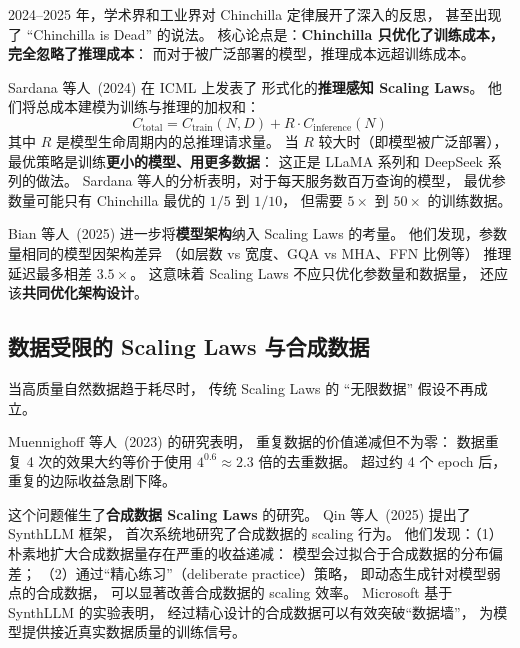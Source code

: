 2024--2025 年，学术界和工业界对 Chinchilla 定律展开了深入的反思，
甚至出现了 “Chinchilla is Dead” 的说法。
核心论点是：\textbf{Chinchilla 只优化了训练成本，
完全忽略了推理成本}：
而对于被广泛部署的模型，推理成本远超训练成本。

Sardana 等人~(2024) 在 ICML 上发表了%
形式化的\textbf{推理感知 Scaling Laws}。
他们将总成本建模为训练与推理的加权和：
\begin{equation}
  C_{\mathrm{total}} = C_{\mathrm{train}}(N, D)
  + R \cdot C_{\mathrm{inference}}(N)
  \label{eq:inference-aware}
\end{equation}
其中 $R$ 是模型生命周期内的总推理请求量。
当 $R$ 较大时（即模型被广泛部署），
最优策略是训练\textbf{更小的模型、用更多数据}：
这正是 LLaMA 系列和 DeepSeek 系列的做法。
Sardana 等人的分析表明，对于每天服务数百万查询的模型，
最优参数量可能只有 Chinchilla 最优的 $1/5$ 到 $1/10$，
但需要 $5\times$ 到 $50\times$ 的训练数据。

Bian 等人~(2025) 进一步将\textbf{模型架构}纳入 Scaling Laws 的考量。%
他们发现，参数量相同的模型因架构差异
（如层数 vs 宽度、GQA vs MHA、FFN 比例等）
推理延迟最多相差 $3.5\times$。
这意味着 Scaling Laws 不应只优化参数量和数据量，
还应该\textbf{共同优化架构设计}。

\subsection{数据受限的 Scaling Laws 与合成数据}
\label{sec:data-constrained}

当高质量自然数据趋于耗尽时，
传统 Scaling Laws 的 “无限数据” 假设不再成立。

Muennighoff 等人~(2023) 的研究表明，%
重复数据的价值递减但不为零：
数据重复 4 次的效果大约等价于使用 $4^{0.6} \approx 2.3$ 倍的去重数据。
超过约 4 个 epoch 后，重复的边际收益急剧下降。

这个问题催生了\textbf{合成数据 Scaling Laws} 的研究。
Qin 等人~(2025) 提出了 SynthLLM 框架，%
首次系统地研究了合成数据的 scaling 行为。
他们发现：（1）朴素地扩大合成数据量存在严重的收益递减：
模型会过拟合于合成数据的分布偏差；
（2）通过“精心练习”（deliberate practice）策略，
即动态生成针对模型弱点的合成数据，
可以显著改善合成数据的 scaling 效率。
Microsoft 基于 SynthLLM 的实验表明，
经过精心设计的合成数据可以有效突破“数据墙”，
为模型提供接近真实数据质量的训练信号。

